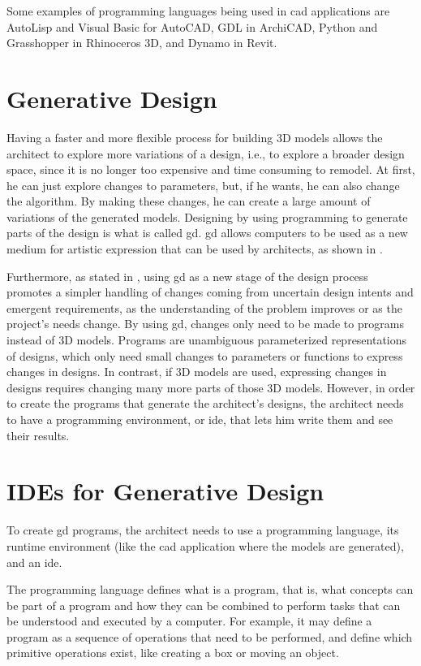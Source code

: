 Some examples of programming languages being used in \gls{cad} applications are AutoLisp and Visual Basic for AutoCAD, GDL\cite{watson2009gdl} in ArchiCAD, Python and Grasshopper in Rhinoceros 3D, and Dynamo in Revit.



\section{Generative Design}
Having a faster and more flexible process for building 3D models allows the architect to explore more variations of a design, i.e., to explore a broader design space, since it is no longer too expensive and time consuming to remodel.
At first, he can just explore changes to parameters, but, if he wants, he can also change the algorithm.
By making these changes, he can create a large amount of variations of the generated models.
Designing by using programming to generate parts of the design is what is called \gls{gd}.
\gls{gd} allows computers to be used as a new medium for artistic expression\cite{Maeda:2001:DN:559503} that can be used by architects, as shown in \cite{terzidis2003expressive}.

Furthermore, as stated in \cite{leitao2014pushing}, using \gls{gd} as a new stage of the design process promotes a simpler handling of changes coming from uncertain design intents and emergent requirements, as the understanding of the problem improves or as the project's needs change.
By using \gls{gd}, changes only need to be made to programs instead of 3D models.
Programs are unambiguous parameterized representations of designs, which only need small changes to parameters or functions to express changes in designs.
In contrast, if 3D models are used, expressing changes in designs requires changing many more parts of those 3D models.
However, in order to create the programs that generate the architect's designs, the architect needs to have a programming environment, or \gls{ide}, that lets him write them and see their results.


\section{IDEs for Generative Design}
To create \gls{gd} programs, the architect needs to use a programming language, its runtime environment (like the \gls{cad} application where the models are generated), and an \gls{ide}.

The programming language defines what is a program, that is, what concepts can be part of a program and how they can be combined to perform tasks that can be understood and executed by a computer.
For example, it may define a program as a sequence of operations that need to be performed, and define which primitive operations exist, like creating a box or moving an object.

